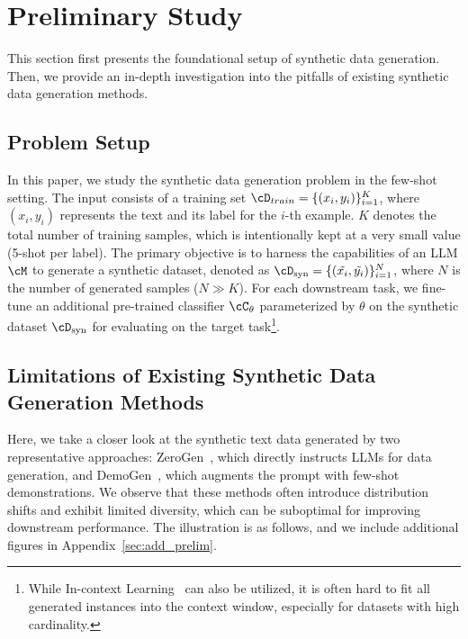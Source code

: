 \section{Preliminary Study}
\vspace{-1ex}
\label{sec:preliminary}
This section first presents the foundational setup of synthetic data generation. 
Then, we provide an in-depth investigation into the pitfalls of existing synthetic data generation methods. 


\vspace{-1ex}
\subsection{Problem Setup}
In this paper, we study the synthetic data generation problem in the few-shot setting.
The input consists of a training set $\cD_{train}=\{(x_i,y_i)\}_{i=1}^K$, where $(x_i, y_i)$ represents the text and its label for the $i$-th example. $K$ denotes the total number of training samples, which is intentionally kept at a very small value (5-shot per label). The primary objective is to harness the capabilities of an LLM $\cM$ to generate a synthetic dataset, denoted as $\cD_{\text{syn}}=\{(\tilde{x_i},\tilde{y_i})\}_{i=1}^N$, where $N$ is the number of generated samples ($N \gg K$). 
For each downstream task, we fine-tune an additional pre-trained classifier $\cC_{\theta}$ parameterized by $\theta$ on the synthetic dataset $\cD_{\text{syn}}$ for evaluating on the target task\footnote{While In-context Learning~\citep{brown2020language} can also be utilized, it is often hard to fit all generated instances into the context window, especially for datasets with high cardinality.}. 





\vspace{-1ex}
\subsection{Limitations of Existing Synthetic Data Generation Methods}
\label{sec:limitations}
Here, we take a closer look at the synthetic text data generated by two representative approaches: ZeroGen~\citep{ye2022zerogen}, which directly instructs LLMs for data generation, and DemoGen~\citep{gpt3mix,meng2023tuning}, which augments the prompt with few-shot demonstrations. 
We observe that these methods often introduce distribution shifts and exhibit limited diversity, which can be suboptimal for improving downstream performance. The illustration is as follows, and we include additional figures in Appendix~\ref{sec:add_prelim}.



